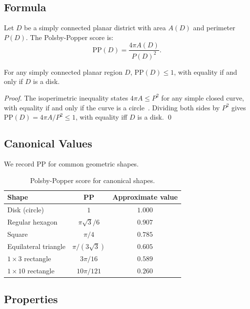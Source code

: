 \subsection{Formula}

Let $D$ be a simply connected planar district with area $A(D)$ and perimeter $P(D)$.
The Polsby-Popper score is:
\begin{equation}
  \text{PP}(D) = \frac{4\pi A(D)}{P(D)^2}.
  \label{eq:pp}
\end{equation}

\begin{theorem}
  For any simply connected planar region $D$, $\text{PP}(D) \leq 1$,
  with equality if and only if $D$ is a disk.
\end{theorem}

\begin{proof}
  The isoperimetric inequality states $4\pi A \leq P^2$ for any simple closed curve,
  with equality if and only if the curve is a circle~\citep{osserman1978isoperimetric}.
  Dividing both sides by $P^2$ gives $\text{PP}(D) = 4\pi A/P^2 \leq 1$,
  with equality iff $D$ is a disk. \qed
\end{proof}

\subsection{Canonical Values}

We record PP for common geometric shapes.

\begin{table}[ht]
\centering
\caption{Polsby-Popper score for canonical shapes.}
\label{tab:canonical}
\begin{tabular}{lcc}
\toprule
Shape & PP & Approximate value \\
\midrule
Disk (circle) & $1$ & $1.000$ \\
Regular hexagon & $\pi\sqrt{3}/6$ & $0.907$ \\
Square         & $\pi/4$        & $0.785$ \\
Equilateral triangle & $\pi/(3\sqrt{3})$ & $0.605$ \\
$1 \times 3$ rectangle & $3\pi/16$ & $0.589$ \\
$1 \times 10$ rectangle & $10\pi/121$ & $0.260$ \\
\bottomrule
\end{tabular}
\end{table}

\subsection{Properties}

